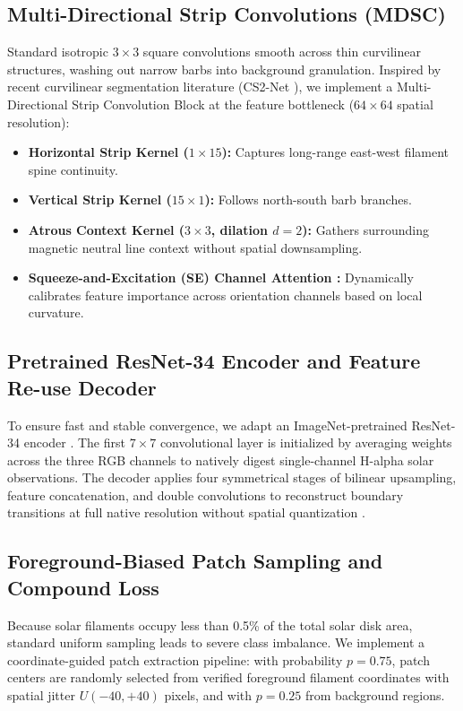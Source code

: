 \documentclass[conference]{IEEEtran}
\begin{document}
\subsection{Multi-Directional Strip Convolutions (MDSC)}
Standard isotropic $3 \times 3$ square convolutions smooth across thin curvilinear structures, washing out narrow barbs into background granulation. Inspired by recent curvilinear segmentation literature (CS2-Net \cite{mou2021cs2}), we implement a Multi-Directional Strip Convolution Block at the feature bottleneck ($64 \times 64$ spatial resolution):
\begin{itemize}
    \item \textbf{Horizontal Strip Kernel ($1 \times 15$):} Captures long-range east-west filament spine continuity.
    \item \textbf{Vertical Strip Kernel ($15 \times 1$):} Follows north-south barb branches.
    \item \textbf{Atrous Context Kernel ($3 \times 3$, dilation $d = 2$):} Gathers surrounding magnetic neutral line context without spatial downsampling.
    \item \textbf{Squeeze-and-Excitation (SE) Channel Attention \cite{hu2018squeeze}:} Dynamically calibrates feature importance across orientation channels based on local curvature.
\end{itemize}

\subsection{Pretrained ResNet-34 Encoder and Feature Re-use Decoder}
To ensure fast and stable convergence, we adapt an ImageNet-pretrained ResNet-34 encoder \cite{he2016deep}. The first $7 \times 7$ convolutional layer is initialized by averaging weights across the three RGB channels to natively digest single-channel H-alpha solar observations. The decoder applies four symmetrical stages of bilinear upsampling, feature concatenation, and double convolutions to reconstruct boundary transitions at full native resolution without spatial quantization \cite{ronneberger2015u}.

\subsection{Foreground-Biased Patch Sampling and Compound Loss}
Because solar filaments occupy less than 0.5\% of the total solar disk area, standard uniform sampling leads to severe class imbalance. We implement a coordinate-guided patch extraction pipeline: with probability $p = 0.75$, patch centers are randomly selected from verified foreground filament coordinates with spatial jitter $U(-40, +40)$ pixels, and with $p = 0.25$ from background regions.
\end{document}

